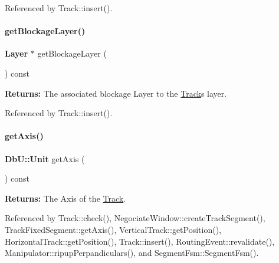 Referenced by Track\+::insert().

\mbox{\label{classKite_1_1Track_aa719edbfb0c3d2f294cf658f1c6bfb37}} 
\paragraph{\texorpdfstring{get\+Blockage\+Layer()}{getBlockageLayer()}}
{\footnotesize\ttfamily \textbf{ Layer} $\ast$ get\+Blockage\+Layer (\begin{DoxyParamCaption}{ }\end{DoxyParamCaption}) const}

{\bfseries Returns\+:} The associated blockage {\ttfamily Layer} to the \mbox{\hyperlink{classKite_1_1Track}{Track}}\textquotesingle{}s layer. 

Referenced by Track\+::insert().

\mbox{\label{classKite_1_1Track_ab5b5aaa5b318369feee6003dbad039c2}} 
\paragraph{\texorpdfstring{get\+Axis()}{getAxis()}}
{\footnotesize\ttfamily \textbf{ Db\+U\+::\+Unit} get\+Axis (\begin{DoxyParamCaption}{ }\end{DoxyParamCaption}) const\hspace{0.3cm}{\ttfamily [inline]}}

{\bfseries Returns\+:} The Axis of the \mbox{\hyperlink{classKite_1_1Track}{Track}}. 

Referenced by Track\+::check(), Negociate\+Window\+::create\+Track\+Segment(), Track\+Fixed\+Segment\+::get\+Axis(), Vertical\+Track\+::get\+Position(), Horizontal\+Track\+::get\+Position(), Track\+::insert(), Routing\+Event\+::revalidate(), Manipulator\+::ripup\+Perpandiculars(), and Segment\+Fsm\+::\+Segment\+Fsm().

\mbox{\label{classKite_1_1Track_a71f401dbc8d152b50522ee459ef63441}} 
